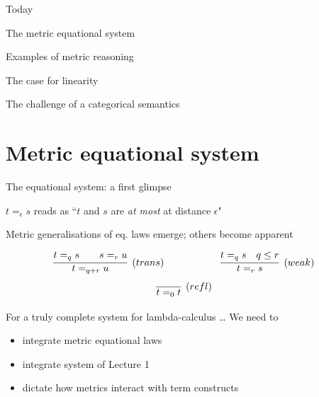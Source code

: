 \documentclass{beamer}
\begin{document}
\begin{frame}{Today}

        The metric equational system

        \medskip
        Examples of metric reasoning 

        \medskip
        The case for linearity

        \medskip
        The challenge of a categorical semantics
\end{frame}

\section{Metric equational system}

\begin{frame}{The equational system: a first glimpse}

        $t =_\epsilon s$ reads as ``$t$ and $s$ are \emph{at most}
        at distance $\epsilon$"

        \bigskip
        Metric generalisations of eq. laws emerge; others 
        become apparent  

        \bigskip
        \begin{examples}
                \[
                        \infer[(trans)]{t =_{q + r} u}
                        {t =_q s \qquad s =_r u}
                        \hspace{2cm}
                        \infer[(weak)]{t =_r s}
                        {t =_q s \quad q \leq r} 
                \]
                \[
                        \infer[(refl)]{t =_0 t}{}
                \]
        \end{examples}

\end{frame}

\begin{frame}{For a truly complete system for lambda-calculus \dots}
        We need to
        \begin{itemize}
                \item integrate metric equational laws
                        \\[5pt]
                \item integrate system of Lecture 1 
                        \\[5pt]
                \item dictate how metrics interact with term constructs
        \end{itemize}
\end{frame}
\end{document}
